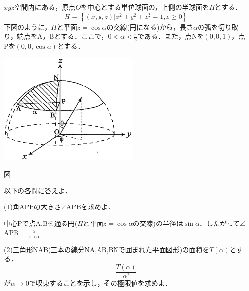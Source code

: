 \documentclass[a4j]{jarticle}
\let \ds \displaystyle
\begin{document}
\section{}

\begin{screen}
$xyz$空間内にある，原点$O$を中心とする単位球面の，上側の半球面を$H$とする．
$$H=\left\{ (x,y,z) | x^2+y^2+z^2=1,z\geq 0\right\}$$
下図のように，$H$と平面$z=\cos \alpha$の交線(円になる)から，長さ$\alpha$の弧を切り取り，端点をA，Bとする．ここで，$0 < \alpha < \frac{\pi}{2}$である．また，点Nを$(0,0,1)$，点Pを$(0,0,\cos\alpha)$とする．
 
\centering\includegraphics[width=7cm]{figure_2012_01.png}
 
\centering 図

以下の各問に答えよ．
\end{screen}

\begin{screen}
 (1)角APBの大きさ$\angle$APBを求めよ．
\end{screen}

中心Pで点A,Bを通る円($H$と平面$z=\cos \alpha$の交線)の半径は$\sin\alpha$．したがって$\angle$APB$=\ds\frac{\alpha}{\sin\alpha}$

\begin{screen}
 (2)三角形NAB(三本の線分NA,AB,BNで囲まれた平面図形)の面積を$T(\alpha)$とする．
 $$\frac{T(\alpha)}{\alpha^2}$$
 が$\alpha\rightarrow 0$で収束することを示し，その極限値を求めよ．
\end{screen}
\end{document}
